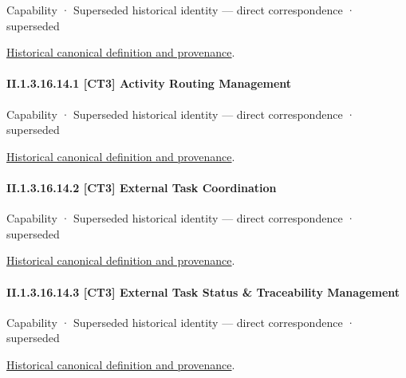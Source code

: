 \label{element:4422d865978c4353ad575759c6026d27}
{\small Capability · Superseded historical identity — direct correspondence · superseded}\par
\href{../../../../continuum/strategy/capability/4422d865978c4353ad575759c6026d27.md}{Historical canonical definition and provenance}.\par
\paragraph*{II.1.3.16.14.1 [CT3] Activity Routing Management}
\label{navigation:II.1.3.16.14.1}

\label{element:243ea93e7b7448fe97dc74f90bfc8946}
{\small Capability · Superseded historical identity — direct correspondence · superseded}\par
\href{../../../../continuum/strategy/capability/243ea93e7b7448fe97dc74f90bfc8946.md}{Historical canonical definition and provenance}.\par
\paragraph*{II.1.3.16.14.2 [CT3] External Task Coordination}
\label{navigation:II.1.3.16.14.2}

\label{element:32be309d65594592bac4d7b068def0d2}
{\small Capability · Superseded historical identity — direct correspondence · superseded}\par
\href{../../../../continuum/strategy/capability/32be309d65594592bac4d7b068def0d2.md}{Historical canonical definition and provenance}.\par
\paragraph*{II.1.3.16.14.3 [CT3] External Task Status \& Traceability Management}
\label{navigation:II.1.3.16.14.3}

\label{element:95985d244a234571892a9e9b4024f594}
{\small Capability · Superseded historical identity — direct correspondence · superseded}\par
\href{../../../../continuum/strategy/capability/95985d244a234571892a9e9b4024f594.md}{Historical canonical definition and provenance}.\par
